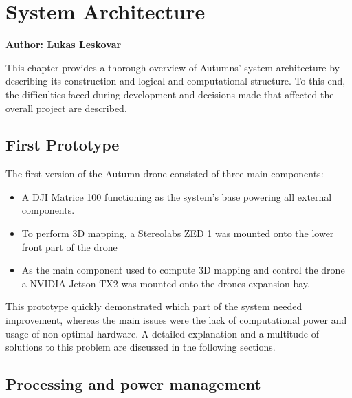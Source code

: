 \chapter{System Architecture}
\label{chapter:architecture}

\textbf{Author: Lukas Leskovar} 

This chapter provides a thorough overview of Autumns' system architecture by describing its construction and logical and computational structure. To this end, the difficulties faced during development and decisions made that affected the overall project are described.

\section{First Prototype}
The first version of the Autumn drone consisted of three main components:
\begin{itemize}
	\item A DJI Matrice 100 functioning as the system's base powering all external components.
	\item To perform 3D mapping, a Stereolabs ZED 1 was mounted onto the lower front part of the drone
	\item As the main component used to compute 3D mapping and control the drone a NVIDIA Jetson TX2 was mounted onto the drones expansion bay.
\end{itemize}
This prototype quickly demonstrated which part of the system needed improvement, whereas the main issues were the lack of computational power and usage of non-optimal hardware. A detailed explanation and a multitude of solutions to this problem are discussed in the following sections.


\section{Processing and power management}



